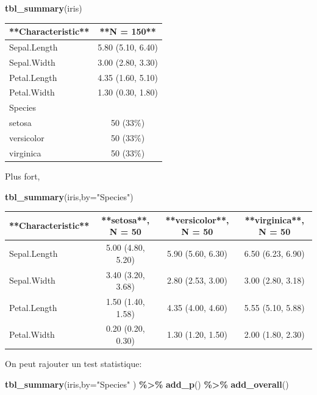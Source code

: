 \documentclass[
]{book}
\newenvironment{Shaded}{\begin{snugshade}}{\end{snugshade}}
\newcommand{\AttributeTok}[1]{\textcolor[rgb]{0.13,0.29,0.53}{#1}}
\newcommand{\FunctionTok}[1]{\textcolor[rgb]{0.13,0.29,0.53}{\textbf{#1}}}
\newcommand{\NormalTok}[1]{#1}
\newcommand{\SpecialCharTok}[1]{\textcolor[rgb]{0.81,0.36,0.00}{\textbf{#1}}}
\newcommand{\StringTok}[1]{\textcolor[rgb]{0.31,0.60,0.02}{#1}}
\begin{document}
\begin{Shaded}
\begin{Highlighting}[]
\FunctionTok{tbl\_summary}\NormalTok{(iris)}
\end{Highlighting}
\end{Shaded}

\begin{tabular}{l|c}
\hline
**Characteristic** & **N = 150**\\
\hline
Sepal.Length & 5.80 (5.10, 6.40)\\
\hline
Sepal.Width & 3.00 (2.80, 3.30)\\
\hline
Petal.Length & 4.35 (1.60, 5.10)\\
\hline
Petal.Width & 1.30 (0.30, 1.80)\\
\hline
Species & \\
\hline
setosa & 50 (33\%)\\
\hline
versicolor & 50 (33\%)\\
\hline
virginica & 50 (33\%)\\
\hline
\end{tabular}

Plus fort,

\begin{Shaded}
\begin{Highlighting}[]
\FunctionTok{tbl\_summary}\NormalTok{(iris,}\AttributeTok{by=}\StringTok{"Species"}\NormalTok{)}
\end{Highlighting}
\end{Shaded}

\begin{tabular}{l|c|c|c}
\hline
**Characteristic** & **setosa**, N = 50 & **versicolor**, N = 50 & **virginica**, N = 50\\
\hline
Sepal.Length & 5.00 (4.80, 5.20) & 5.90 (5.60, 6.30) & 6.50 (6.23, 6.90)\\
\hline
Sepal.Width & 3.40 (3.20, 3.68) & 2.80 (2.53, 3.00) & 3.00 (2.80, 3.18)\\
\hline
Petal.Length & 1.50 (1.40, 1.58) & 4.35 (4.00, 4.60) & 5.55 (5.10, 5.88)\\
\hline
Petal.Width & 0.20 (0.20, 0.30) & 1.30 (1.20, 1.50) & 2.00 (1.80, 2.30)\\
\hline
\end{tabular}

On peut rajouter un test statistique:

\begin{Shaded}
\begin{Highlighting}[]
\FunctionTok{tbl\_summary}\NormalTok{(iris,}\AttributeTok{by=}\StringTok{"Species"}\NormalTok{ ) }\SpecialCharTok{\%\textgreater{}\%} \FunctionTok{add\_p}\NormalTok{() }\SpecialCharTok{\%\textgreater{}\%} \FunctionTok{add\_overall}\NormalTok{()}
\end{Highlighting}
\end{Shaded}
\end{document}

